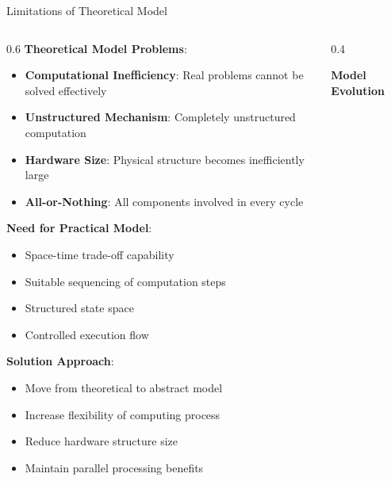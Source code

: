 \documentclass[aspectratio=169]{beamer}
\newcommand{\concept}[1]{\textbf{\color{darkblue}#1}}
\begin{document}
\begin{frame}{Limitations of Theoretical Model}
\begin{columns}
\begin{column}{0.6\textwidth}
\concept{Theoretical Model Problems}:
\begin{itemize}
\item \textbf{Computational Inefficiency}: Real problems cannot be solved effectively
\item \textbf{Unstructured Mechanism}: Completely unstructured computation
\item \textbf{Hardware Size}: Physical structure becomes inefficiently large
\item \textbf{All-or-Nothing}: All components involved in every cycle
\end{itemize}

\vspace{0.3cm}
\concept{Need for Practical Model}:
\begin{itemize}
\item Space-time trade-off capability
\item Suitable sequencing of computation steps
\item Structured state space
\item Controlled execution flow
\end{itemize}

\vspace{0.3cm}
\concept{Solution Approach}:
\begin{itemize}
\item Move from theoretical to abstract model
\item Increase flexibility of computing process
\item Reduce hardware structure size
\item Maintain parallel processing benefits
\end{itemize}
\end{column}
\begin{column}{0.4\textwidth}
\begin{center}
\textbf{Model Evolution}
\vspace{0.3cm}

\end{center}
\end{column}
\end{columns}
\end{frame}
\end{document}
